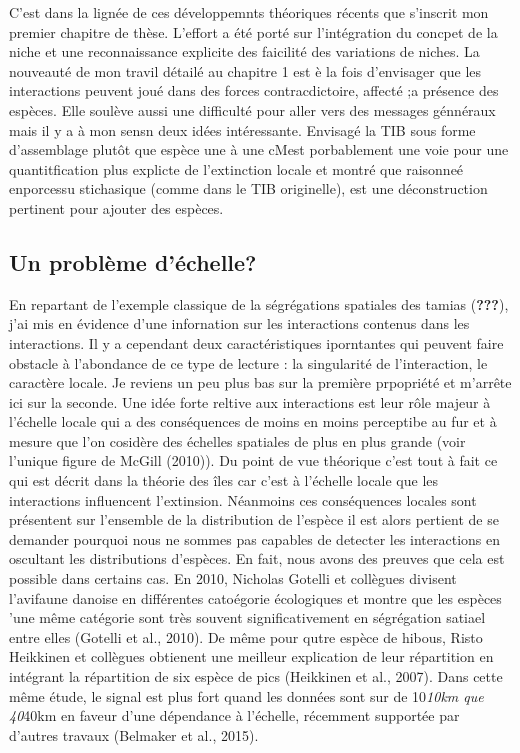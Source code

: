 C'est dans la lignée de ces développemnts théoriques récents que
s'inscrit mon premier chapitre de thèse. L'effort a été porté sur
l'intégration du concpet de la niche et une reconnaissance explicite des
faicilité des variations de niches. La nouveauté de mon travil détailé
au chapitre 1 est è la fois d'envisager que les interactions peuvent
joué dans des forces contracdictoire, affecté ;a présence des espèces.
Elle soulève aussi une difficulté pour aller vers des messages génnéraux
mais il y a à mon sensn deux idées intéressante. Envisagé la TIB sous
forme d'assemblage plutôt que espèce une à une cMest porbablement une
voie pour une quantitfication plus explicte de l'extinction locale et
montré que raisonneé enporcessu stichasique (comme dans le TIB
originelle), est une déconstruction pertinent pour ajouter des espèces.

\subsection*{Un problème d'échelle?}\label{un-probluxe8me-duxe9chelle}

En repartant de l'exemple classique de la ségrégations spatiales des
tamias ({\textbf{???}}), j'ai mis en évidence d'une infornation sur les
interactions contenus dans les interactions. Il y a cependant deux
caractéristiques iporntantes qui peuvent faire obstacle à l'abondance de
ce type de lecture : la singularité de l'interaction, le caractère
locale. Je reviens un peu plus bas sur la première prpopriété et
m'arrête ici sur la seconde. Une idée forte reltive aux interactions est
leur rôle majeur à l'échelle locale qui a des conséquences de moins en
moins perceptibe au fur et à mesure que l'on cosidère des échelles
spatiales de plus en plus grande (voir l'unique figure de McGill
(2010)). Du point de vue théorique c'est tout à fait ce qui est décrit
dans la théorie des îles car c'est à l'échelle locale que les
interactions influencent l'extinsion. Néanmoins ces conséquences locales
sont présentent sur l'ensemble de la distribution de l'espèce il est
alors pertient de se demander pourquoi nous ne sommes pas capables de
detecter les interactions en oscultant les distributions d'espèces. En
fait, nous avons des preuves que cela est possible dans certains cas. En
2010, Nicholas Gotelli et collègues divisent l'avifaune danoise en
différentes catoégorie écologiques et montre que les espèces 'une même
catégorie sont très souvent significativement en ségrégation satiael
entre elles (Gotelli et al., 2010). De même pour qutre espèce de hibous,
Risto Heikkinen et collègues obtienent une meilleur explication de leur
répartition en intégrant la répartition de six espèce de pics (Heikkinen
et al., 2007). Dans cette même étude, le signal est plus fort quand les
données sont sur de 10\emph{10km que 40}40km en faveur d'une dépendance
à l'échelle, récemment supportée par d'autres travaux (Belmaker et al.,
2015).

